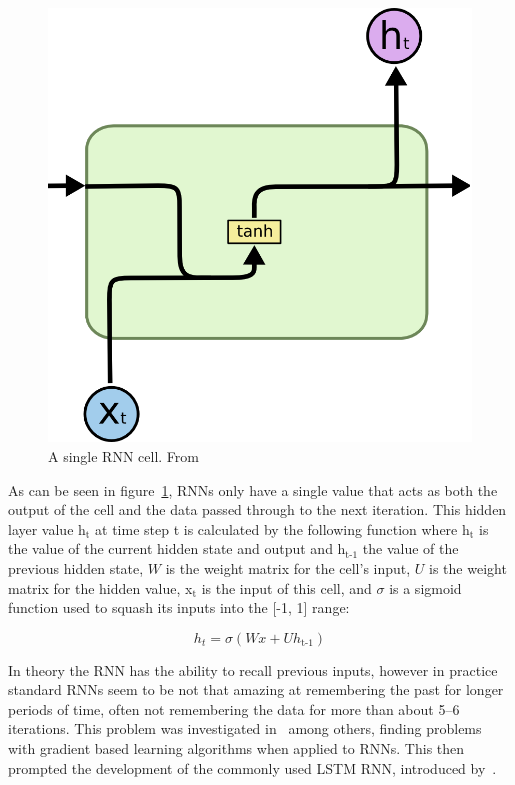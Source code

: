 \begin{figure}
	\begin{center}
		\includegraphics[scale=0.5]{rnn/rnn_cell}
	\end{center}
	\caption{A single RNN cell. From~\cite{olah2015understanding}\label{fig:rnn_cell}}
\end{figure}

As can be seen in figure~\ref{fig:rnn_cell}, RNNs only have a single value that acts as both the output of the cell and the data passed through to the next iteration. This hidden layer value h\(_{\text{t}}\) at time step t is calculated by the following function where h\(_{\text{t}}\) is the value of the current hidden state and output and h\(_{\text{t-1}}\) the value of the previous hidden state, \(W\) is the weight matrix for the cell's input, \(U\) is the weight matrix for the hidden value, x\(_{\text{t}}\) is the input of this cell, and \(\sigma \) is a sigmoid function used to squash its inputs into the [-1, 1] range:

$$ h_t = \sigma(Wx + Uh_\text{t-1}) $$

In theory the RNN has the ability to recall previous inputs, however in practice standard RNNs seem to be not that amazing at remembering the past for longer periods of time, often not remembering the data for more than about 5--6 iterations. This problem was investigated in~\cite{bengio1994learning} among others, finding problems with gradient based learning algorithms when applied to RNNs. This then prompted the development of the commonly used LSTM RNN, introduced by~\cite{hochreiter1997long}\@.

